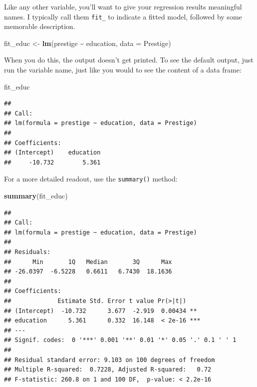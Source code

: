 \documentclass[
  12pt,
  oneside,openany]{book}
\newenvironment{Shaded}{\begin{snugshade}}{\end{snugshade}}
\newcommand{\DataTypeTok}[1]{\textcolor[rgb]{0.13,0.29,0.53}{#1}}
\newcommand{\KeywordTok}[1]{\textcolor[rgb]{0.13,0.29,0.53}{\textbf{#1}}}
\newcommand{\NormalTok}[1]{#1}
\newcommand{\OperatorTok}[1]{\textcolor[rgb]{0.81,0.36,0.00}{\textbf{#1}}}
\newcommand{\StringTok}[1]{\textcolor[rgb]{0.31,0.60,0.02}{#1}}
\begin{document}
Like any other variable, you'll want to give your regression results meaningful names. I typically call them \texttt{fit\_} to indicate a fitted model, followed by some memorable description.

\begin{Shaded}
\begin{Highlighting}[]
\NormalTok{fit\_educ \textless{}{-}}\StringTok{ }\KeywordTok{lm}\NormalTok{(prestige }\OperatorTok{\textasciitilde{}}\StringTok{ }\NormalTok{education, }\DataTypeTok{data =}\NormalTok{ Prestige)}
\end{Highlighting}
\end{Shaded}

When you do this, the output doesn't get printed. To see the default output, just run the variable name, just like you would to see the content of a data frame:

\begin{Shaded}
\begin{Highlighting}[]
\NormalTok{fit\_educ}
\end{Highlighting}
\end{Shaded}

\begin{verbatim}
## 
## Call:
## lm(formula = prestige ~ education, data = Prestige)
## 
## Coefficients:
## (Intercept)    education  
##     -10.732        5.361
\end{verbatim}

For a more detailed readout, use the \texttt{summary()} method:

\begin{Shaded}
\begin{Highlighting}[]
\KeywordTok{summary}\NormalTok{(fit\_educ)}
\end{Highlighting}
\end{Shaded}

\begin{verbatim}
## 
## Call:
## lm(formula = prestige ~ education, data = Prestige)
## 
## Residuals:
##      Min       1Q   Median       3Q      Max 
## -26.0397  -6.5228   0.6611   6.7430  18.1636 
## 
## Coefficients:
##             Estimate Std. Error t value Pr(>|t|)    
## (Intercept)  -10.732      3.677  -2.919  0.00434 ** 
## education      5.361      0.332  16.148  < 2e-16 ***
## ---
## Signif. codes:  0 '***' 0.001 '**' 0.01 '*' 0.05 '.' 0.1 ' ' 1
## 
## Residual standard error: 9.103 on 100 degrees of freedom
## Multiple R-squared:  0.7228, Adjusted R-squared:   0.72 
## F-statistic: 260.8 on 1 and 100 DF,  p-value: < 2.2e-16
\end{verbatim}
\end{document}
